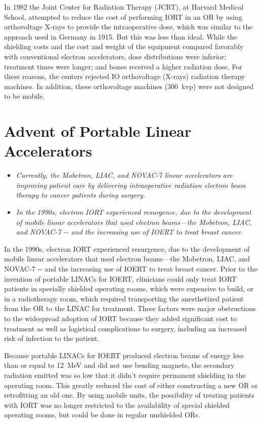 In 1982 the Joint Center for Radiation Therapy (JCRT), at Harvard
Medical School, attempted to reduce the cost of performing IORT in an OR
by using orthovoltage X-rays to provide the intraoperative dose, which
was similar to the approach used in Germany in 1915. But this was less
than ideal. While the shielding costs and the cost and weight of the
equipment compared favorably with conventional electron accelerators,
dose distributions were inferior; treatment times were longer; and bones
received a higher radiation dose. For these reasons, the centers
rejected IO orthovoltage (X-rays) radiation therapy machines. In
addition, these orthovoltage machines (300~kvp) were not designed to be
mobile.

\section{Advent of Portable Linear
Accelerators}\label{advent-of-portable-linear-accelerators}

\begin{itemize}
\item
  \emph{Currently, the Mobetron, LIAC, and NOVAC-7 linear accelerators
  are improving patient care by delivering intraoperative radiation
  electron beam therapy to cancer patients during surgery.}
\item
  \emph{In the 1990s, electron IORT experienced resurgence, due to the
  development of mobile linear accelerators that used electron
  beams---the Mobetron, LIAC, and NOVAC-7 -\/- and the increasing use of
  IOERT to treat breast cancer.}
\end{itemize}

In the 1990s, electron IORT experienced resurgence, due to the
development of mobile linear accelerators that used electron beams---the
Mobetron, LIAC, and NOVAC-7 -\/- and the increasing use of IOERT to
treat breast cancer. Prior to the invention of portable LINACs for
IOERT, clinicians could only treat IORT patients in specially shielded
operating rooms, which were expensive to build, or in a radiotherapy
room, which required transporting the anesthetized patient from the OR
to the LINAC for treatment. These factors were major obstructions to the
widespread adoption of IORT because they added significant cost to
treatment as well as logistical complications to surgery, including an
increased risk of infection to the patient.

Because portable LINACs for IOERT produced electron beams of energy less
than or equal to 12~MeV and did not use bending magnets, the secondary
radiation emitted was so low that it didn't require permanent shielding
in the operating room. This greatly reduced the cost of either
constructing a new OR or retrofitting an old one. By using mobile units,
the possibility of treating patients with IORT was no longer restricted
to the availability of special shielded operating rooms, but could be
done in regular unshielded ORs.

